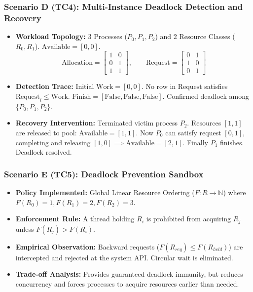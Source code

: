 \documentclass[11pt,a4paper]{article}
\begin{document}
\subsubsection{Scenario D (TC4): Multi-Instance Deadlock Detection and Recovery}
\begin{itemize}[leftmargin=1.5em,noitemsep]
    \item \textbf{Workload Topology:} 3 Processes ($P_0, P_1, P_2$) and 2 Resource Classes ($R_0, R_1$). $\text{Available} = [0, 0]$.
    $$\text{Allocation} = \begin{bmatrix} 1 & 0 \\ 0 & 1 \\ 1 & 1 \end{bmatrix}, \qquad \text{Request} = \begin{bmatrix} 0 & 1 \\ 1 & 0 \\ 0 & 1 \end{bmatrix}$$
    \item \textbf{Detection Trace:} Initial $\text{Work} = [0, 0]$. No row in $\text{Request}$ satisfies $\text{Request}_i \le \text{Work}$. $\text{Finish} = [\text{False}, \text{False}, \text{False}]$. Confirmed deadlock among $\{P_0, P_1, P_2\}$.
    \item \textbf{Recovery Intervention:} Terminated victim process $P_2$. Resources $[1, 1]$ are released to pool: $\text{Available} = [1, 1]$.
    Now $P_0$ can satisfy request $[0, 1]$, completing and releasing $[1, 0] \implies \text{Available} = [2, 1]$. Finally $P_1$ finishes. Deadlock resolved.
\end{itemize}

\subsubsection{Scenario E (TC5): Deadlock Prevention Sandbox}
\begin{itemize}[leftmargin=1.5em,noitemsep]
    \item \textbf{Policy Implemented:} Global Linear Resource Ordering ($F: R \to \mathbb{N}$) where $F(R_0) = 1, F(R_1) = 2, F(R_2) = 3$.
    \item \textbf{Enforcement Rule:} A thread holding $R_i$ is prohibited from acquiring $R_j$ unless $F(R_j) > F(R_i)$.
    \item \textbf{Empirical Observation:} Backward requests ($F(R_{req}) \le F(R_{held})$) are intercepted and rejected at the system API. Circular wait is eliminated.
    \item \textbf{Trade-off Analysis:} Provides guaranteed deadlock immunity, but reduces concurrency and forces processes to acquire resources earlier than needed.
\end{itemize}
\end{document}
